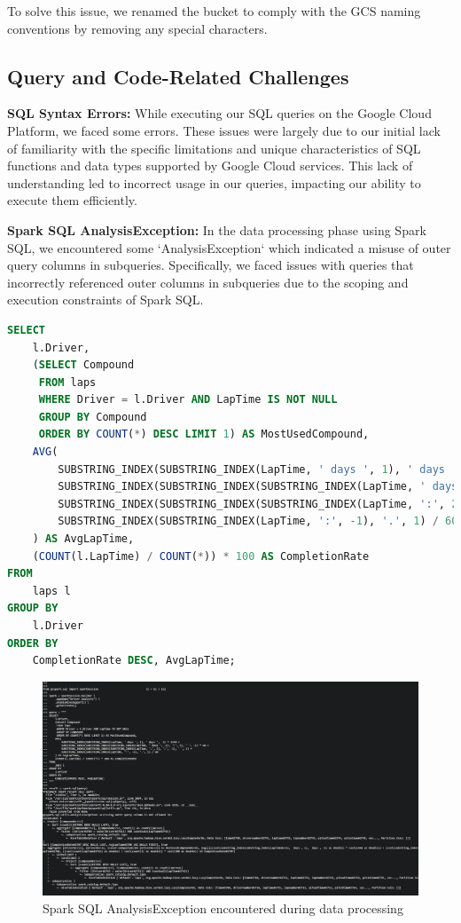 \documentclass{article}
\begin{document}
To solve this issue, we renamed the bucket to comply with the GCS naming conventions by removing any special characters.

\subsection{Query and Code-Related Challenges}
\textbf{SQL Syntax Errors:}
While executing our SQL queries on the Google Cloud Platform, we faced some errors. These issues were largely due to our initial lack of familiarity with the specific limitations and unique characteristics of SQL functions and data types supported by Google Cloud services. This lack of understanding led to incorrect usage in our queries, impacting our ability to execute them efficiently.

\textbf{Spark SQL AnalysisException:}
In the data processing phase using Spark SQL, we encountered some `AnalysisException` which indicated a misuse of outer query columns in subqueries. Specifically, we faced issues with queries that incorrectly referenced outer columns in subqueries due to the scoping and execution constraints of Spark SQL.

\begin{lstlisting}[language=SQL]
SELECT
    l.Driver,
    (SELECT Compound
     FROM laps
     WHERE Driver = l.Driver AND LapTime IS NOT NULL
     GROUP BY Compound
     ORDER BY COUNT(*) DESC LIMIT 1) AS MostUsedCompound,
    AVG(
        SUBSTRING_INDEX(SUBSTRING_INDEX(LapTime, ' days ', 1), ' days ', -1) * 1440 +
        SUBSTRING_INDEX(SUBSTRING_INDEX(SUBSTRING_INDEX(LapTime, ' days ', -1), ':', 1), ' ', -1) * 60 +
        SUBSTRING_INDEX(SUBSTRING_INDEX(SUBSTRING_INDEX(LapTime, ':', 2), ':', -1), ' ', 1) +
        SUBSTRING_INDEX(SUBSTRING_INDEX(LapTime, ':', -1), '.', 1) / 60
    ) AS AvgLapTime,
    (COUNT(l.LapTime) / COUNT(*)) * 100 AS CompletionRate
FROM
    laps l
GROUP BY
    l.Driver
ORDER BY
    CompletionRate DESC, AvgLapTime;
\end{lstlisting}

\begin{figure}[H]
    \centering
    \includegraphics[width=\textwidth]{error-sparkanalysisexception.jpeg}
    \caption{Spark SQL AnalysisException encountered during data processing}
\end{figure}
\end{document}
